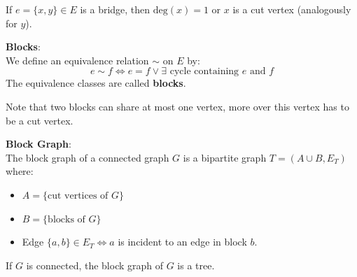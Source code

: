 \begin{lemma}

                If $e = \{x, y\} \in E$ is a bridge, then $\text{deg}(x) = 1$ or $x$ is a cut vertex (analogously for
                $y$).
            
\end{lemma}

\begin{definition}

\textbf{Blocks}:\\

                We define an equivalence relation $\sim$ on $E$ by:
                $$e \sim f \iff e=f \lor \exists \text{ cycle containing } e \text{ and } f$$
                The equivalence classes are called \textbf{blocks}.
            
\end{definition}

            Note that two blocks can share at most one vertex, more over this vertex has to be a cut vertex.

            \begin{definition}

\textbf{Block Graph}:\\

                The block graph of a connected graph $G$ is a bipartite graph $T = (A \cup B, E_T)$ where:
                \begin{itemize}
    \item $A = \{\text{cut vertices of } G\}$
    \item $B = \{\text{blocks of } G\}$
    \item Edge $\{a, b\} \in E_T \iff a$ is incident to an edge in block $b$.
\end{itemize}

\end{definition}

\begin{theorem}

                If $G$ is connected, the block graph of $G$ is a tree.
            
\end{theorem}

